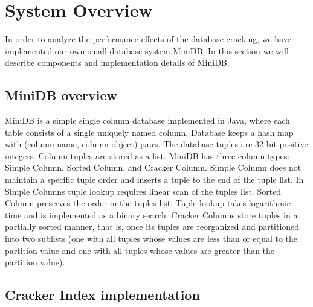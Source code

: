 \section{System Overview}
In  order to analyze the performance effects of the database cracking, we have implemented our own small database system MiniDB. In this section we will describe components and implementation details of MiniDB.
\label{sec:system}

\subsection{MiniDB overview}
MiniDB is a simple single column database implemented in Java, where each table consists of a single uniquely named column. Database keeps a hash map with (column name, column object) pairs. The database tuples are 32-bit positive integers. Column tuples are stored as a list. MiniDB has three column types: Simple Column, Sorted Column, and Cracker Column. Simple Column does not maintain a specific tuple order and inserts a tuple to the end of the tuple list. In Simple Columns tuple lookup requires linear scan of the tuples list. Sorted Column preserves the order in the tuples list. Tuple lookup takes logarithmic time and is implemented as a binary search. Cracker Columns store tuples in a partially sorted manner, that is, once its tuples are reorganized and partitioned into two sublists (one with all tuples whose values are less than or equal to the partition value and one with all tuples whose values are greater than the partition value).
\subsection{Cracker Index implementation}
